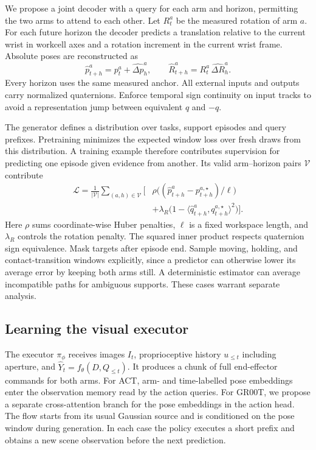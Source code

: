 \documentclass[letterpaper,10pt,conference]{ieeeconf}
\begin{document}
We propose a joint decoder with a query for each arm and horizon, permitting the two arms to attend to each other. Let $R_t^a$ be the measured rotation of arm $a$. For each future horizon the decoder predicts a translation relative to the current wrist in workcell axes and a rotation increment in the current wrist frame. Absolute poses are reconstructed as
\begin{equation}
\widehat p^a_{t+h}=p^a_t+\widehat{\Delta p}^a_h,\qquad
\widehat R^a_{t+h}=R^a_t\,\widehat{\Delta R}^a_h .
\end{equation}
Every horizon uses the same measured anchor. All external inputs and outputs carry normalized quaternions. Enforce temporal sign continuity on input tracks to avoid a representation jump between equivalent $q$ and $-q$.

The generator defines a distribution over tasks, support episodes and query prefixes. Pretraining minimizes the expected window loss over fresh draws from this distribution. A training example therefore contributes supervision for predicting one episode given evidence from another. Its valid arm--horizon pairs $\mathcal V$ contribute
\begin{align}
\mathcal L=\frac{1}{|\mathcal V|}\sum_{(a,h)\in\mathcal V}
\Big[&\rho\big((\widehat p^a_{t+h}-p^{a,\star}_{t+h})/\ell\big)\nonumber\\
&+\lambda_R\big(1-\langle\widehat q^a_{t+h},q^{a,\star}_{t+h}\rangle^2\big)\Big].
\label{eq:loss}
\end{align}
Here $\rho$ sums coordinate-wise Huber penalties, $\ell$ is a fixed workspace length, and $\lambda_R$ controls the rotation penalty. The squared inner product respects quaternion sign equivalence. Mask targets after episode end. Sample moving, holding, and contact-transition windows explicitly, since a predictor can otherwise lower its average error by keeping both arms still. A deterministic estimator can average incompatible paths for ambiguous supports. These cases warrant separate analysis.

\subsection{Learning the visual executor}
The executor $\pi_\phi$ receives images $I_t$, proprioceptive history $u_{\le t}$ including aperture, and $\widehat Y_t=f_\theta(D,Q_{\le t})$. It produces a chunk of full end-effector commands for both arms. For ACT, arm- and time-labelled pose embeddings enter the observation memory read by the action queries. For GR00T, we propose a separate cross-attention branch for the pose embeddings in the action head. The flow starts from its usual Gaussian source and is conditioned on the pose window during generation. In each case the policy executes a short prefix and obtains a new scene observation before the next prediction.
\end{document}
